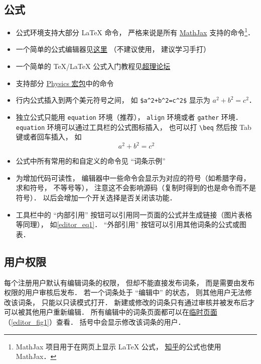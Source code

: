 \subsection{公式}
\begin{itemize}
\item 公式环境支持大部分 LaTeX 命令， 严格来说是所有 \href{https://www.mathjax.org/}{MathJax} 支持的命令\footnote{MathJax 项目用于在网页上显示 LaTeX 公式， \href{https://www.zhihu.com/}{知乎}的公式也使用 MathJax．}．
\item 一个简单的公式编辑器见\href{https://www.codecogs.com/latex/eqneditor.php}{这里} （不建议使用， 建议学习手打）
\item 一个简单的 TeX/LaTeX 公式入门教程见\href{https://chaoli.club/index.php/211}{超理论坛}
\item 支持部分 \href{http://mirrors.ibiblio.org/CTAN/macros/latex/contrib/physics/physics.pdf}{Physics 宏包}中的命令
\item 行内公式插入到两个美元符号之间， 如 \lstinline|$a^2+b^2=c^2$| 显示为 $a^2 + b^2 = c^2$．
\item 独立公式只能用 \lstinline|equation| 环境（推荐）， \lstinline|align| 环境或者 \lstinline|gather| 环境． \lstinline|equation| 环境可以通过工具栏的公式图标插入， 也可以打 \lstinline|\beq| 然后按 Tab 键或者回车插入， 如
\begin{equation}\label{editor_eq1}
a^2 + b^2 = c^2
\end{equation}
\item 公式中所有常用的和自定义的命令见 “词条示例”
\item 为增加代码可读性， 编辑器中一些命令会显示为对应的符号（如希腊字母， 求和符号， 不等号等）， 注意这不会影响源码（复制时得到的也是命令而不是符号）． 以后会增加一个开关选择是否关闭该功能．
\item 工具栏中的 “内部引用” 按钮可以引用同一页面的公式并生成链接（图片表格等同理）， 如\autoref{editor_eq1}． “外部引用” 按钮可以引用其他词条的公式或图表．
\end{itemize}

\subsection{用户权限}
每个注册用户默认有编辑词条的权限， 但却不能直接发布词条， 而是需要由发布权限的用户审核后发布． 若一个词条处于 “编辑中” 的状态， 则其他用户无法修改该词条， 只能以只读模式打开． 新建或修改的词条只有通过审核并被发布后才可以被其他用户重新编辑． 所有编辑中的词条页面都可以在\href{http://wuli.wiki/changed/changed.html}{临时页面}（\autoref{editor_fig1}）查看． 括号中会显示修改该词条的用户．

